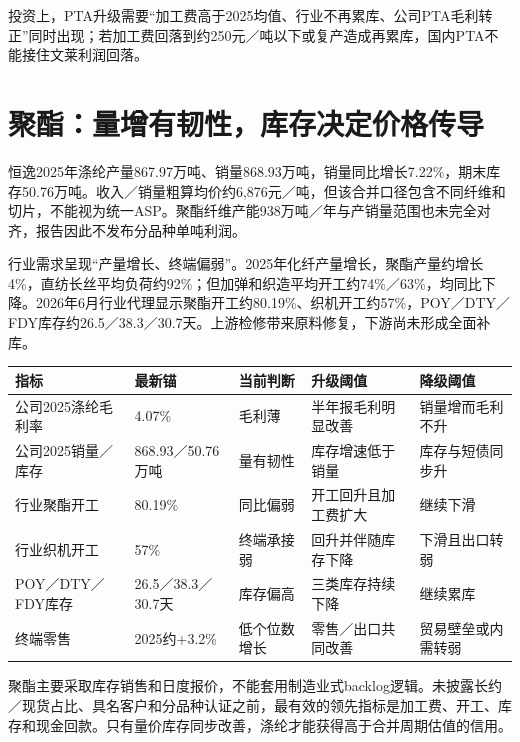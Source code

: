 投资上，PTA升级需要“加工费高于2025均值、行业不再累库、公司PTA毛利转正”同时出现；若加工费回落到约250元／吨以下或复产造成再累库，国内PTA不能接住文莱利润回落。

\section{聚酯：量增有韧性，库存决定价格传导}

恒逸2025年涤纶产量867.97万吨、销量868.93万吨，销量同比增长7.22\%，期末库存50.76万吨。收入／销量粗算均价约6,876元／吨，但该合并口径包含不同纤维和切片，不能视为统一ASP。聚酯纤维产能938万吨／年与产销量范围也未完全对齐，报告因此不发布分品种单吨利润。

行业需求呈现“产量增长、终端偏弱”。2025年化纤产量增长，聚酯产量约增长4\%，直纺长丝平均负荷约92\%；但加弹和织造平均开工约74\%／63\%，均同比下降。2026年6月行业代理显示聚酯开工约80.19\%、织机开工约57\%，POY／DTY／FDY库存约26.5／38.3／30.7天。上游检修带来原料修复，下游尚未形成全面补库。

\begin{exhibitbox}[聚酯验证仪表盘]
\small
\noindent\begin{tabularx}{\textwidth}{L{2.9cm}R{2.0cm}L{2.35cm}L{2.4cm}X}
\toprule
\textbf{指标} & \textbf{最新锚} & \textbf{当前判断} & \textbf{升级阈值} & \textbf{降级阈值} \\
\midrule
公司2025涤纶毛利率 & 4.07\% & 毛利薄 & 半年报毛利明显改善 & 销量增而毛利不升 \\
公司2025销量／库存 & 868.93／50.76万吨 & 量有韧性 & 库存增速低于销量 & 库存与短债同步升 \\
行业聚酯开工 & 80.19\% & 同比偏弱 & 开工回升且加工费扩大 & 继续下滑 \\
行业织机开工 & 57\% & 终端承接弱 & 回升并伴随库存下降 & 下滑且出口转弱 \\
POY／DTY／FDY库存 & 26.5／38.3／30.7天 & 库存偏高 & 三类库存持续下降 & 继续累库 \\
终端零售 & 2025约+3.2\% & 低个位数增长 & 零售／出口共同改善 & 贸易壁垒或内需转弱 \\
\bottomrule
\end{tabularx}
\end{exhibitbox}

聚酯主要采取库存销售和日度报价，不能套用制造业式backlog逻辑。未披露长约／现货占比、具名客户和分品种认证之前，最有效的领先指标是加工费、开工、库存和现金回款。只有量价库存同步改善，涤纶才能获得高于合并周期估值的信用。

